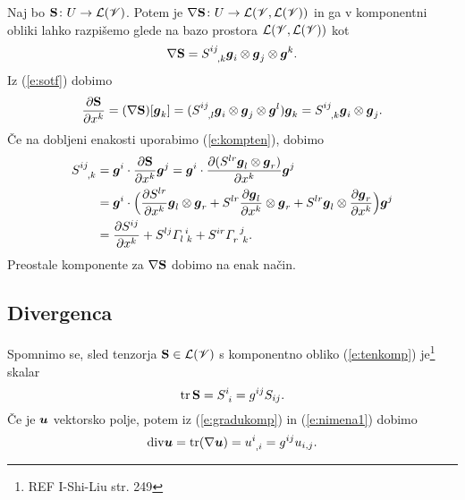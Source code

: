Naj bo $\mathbf S\colon U\to\mathcal L(\mathscr V)$. Potem je $\nabla\mathbf S\colon U\to\mathcal L(\mathscr V,\mathcal L(\mathscr V))$
in ga v komponentni obliki lahko razpišemo glede na bazo prostora $\mathcal L(\mathscr V,\mathcal L(\mathscr V))$ kot
\[ \nabla\ten{S}=\topbot{S}{ij}{,k}\vek{g}_i\otimes\vek{g}_j\otimes\vek{g}^k. \]
Iz (\ref{e:sotf}) dobimo
\[
	\frac{\partial\ten{S}}{\partial x^k}=(\nabla\ten{S})[\vek{g}_k]=
	(\topbot{S}{ij}{,l}\vek{g}_i\otimes\vek{g}_j\otimes\vek{g}^l)\vek{g}_k=
	\topbot{S}{ij}{,k}\vek{g}_i\otimes\vek{g}_j.
\]
Če na dobljeni enakosti uporabimo (\ref{e:kompten}), dobimo
\begin{align*}
	\topbot{S}{ij}{,k}&=\vek{g}^i\cdot\frac{\partial\ten{S}}{\partial x^k}\vek{g}^j=
	\vek{g}^i\cdot\frac{\partial(S^{lr}\vek{g}_l\otimes\vek{g}_r)}{\partial x^k}\vek{g}^j \\
	&=\vek{g}^i\cdot\Big(
	\frac{\partial S^{lr}}{\partial x^k}\vek{g}_l\otimes\vek{g}_r+
	S^{lr}\frac{\partial\vek{g}_l}{\partial x^k}\otimes\vek{g}_r+
	S^{lr}\vek{g}_l\otimes\frac{\partial\vek{g}_r}{\partial x^k}
	\Big)\vek{g}^j \\
	&=\frac{\partial S^{ij}}{\partial x^k}+S^{lj}\cs{l}{i}{k}+S^{ir}\cs{r}{j}{k}.
\end{align*}
Preostale komponente za $\nabla\mathbf S$ dobimo na enak način.


\subsection{Divergenca}


Spomnimo se, sled tenzorja $\mathbf S\in\mathcal L(\mathscr V)$ s komponentno obliko (\ref{e:tenkomp})
je\footnote{REF I-Shi-Liu str. 249} skalar
\[ \tr\,\ten{S}=\topbot{S}{i}{i}=g^{ij}S_{ij}. \]
Če je $\boldsymbol u$ vektorsko polje, potem iz (\ref{e:gradukomp}) in (\ref{e:nimena1}) dobimo
\begin{equation} \label{e:divu}
	\div\vek{u} = \tr(\nabla\vek{u}) = \topbot{u}{i}{,i} = g^{ij}u_{i,j}.
\end{equation}

